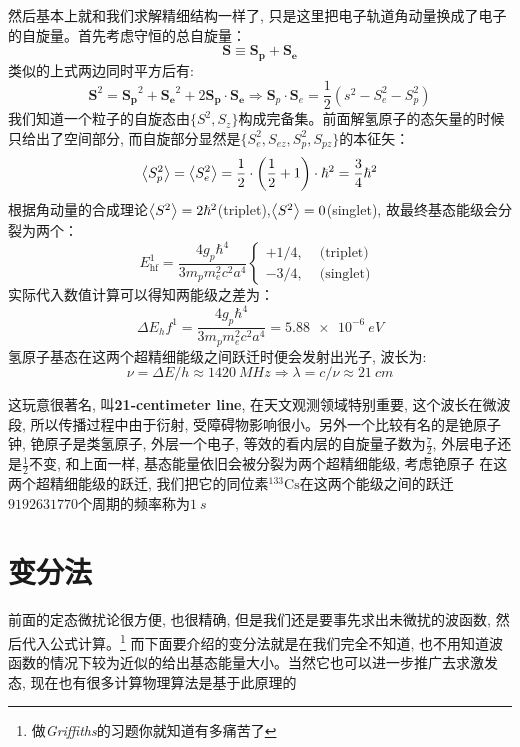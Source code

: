 \documentclass[a4paper,zihao=-4,linespread=1]{ctexrep}
\begin{document}
    然后基本上就和我们求解精细结构一样了, 只是这里把电子轨道角动量换成了电子的自旋量。首先考虑守恒的总自旋量：
    $$\mathbf{S}\equiv\mathbf{S_p}+\mathbf{S_e}$$
    类似的上式两边同时平方后有:
    \begin{equation}
        \mathbf{S}^2=\mathbf{S_p}^2+\mathbf{S_e}^2+2\mathbf{S_p}\cdot\mathbf{S_e}\Rightarrow\mathbf{S}_{p} \cdot \mathbf{S}_{e}=\frac{1}{2}\left(s^{2}-S_{e}^{2}-S_{p}^{2}\right)
    \end{equation}
    我们知道一个粒子的自旋态由$\{S^2,S_z\}$构成完备集。前面解氢原子的态矢量的时候只给出了空间部分, 而自旋部分显然是$\{S_e^2,S_{ez},S_p^2,S_{pz}\}$的本征矢：
    $$\Braket{S_p^2}=\Braket{S_e^2}=\frac{1}{2}\cdot\left(\frac{1}{2}+1\right)\cdot\hbar^2=\frac{3}{4}\hbar^2$$
    根据角动量的合成理论$\Braket{S^2}=2\hbar^2$(triplet),$\Braket{S^2}=0$(singlet), 故最终基态能级会分裂为两个：
    \begin{equation}
        E_{\mathrm{hf}}^{1}=\frac{4 g_{p} \hbar^{4}}{3 m_{p} m_{e}^{2} c^{2} a^{4}}\left\{\begin{array}{ll}
            +1 / 4, & \text { (triplet) } \\
            -3 / 4, & \text { (singlet) }
            \end{array}\right.
    \end{equation}
    实际代入数值计算可以得知两能级之差为：
    $$\Delta E_hf^1=\frac{4 g_{p} \hbar^{4}}{3 m_{p} m_{e}^{2} c^{2} a^{4}}=\SI{5.88e-6}{eV}$$
    氢原子基态在这两个超精细能级之间跃迁时便会发射出光子, 波长为:
    $$\nu=\Delta E/h\approx\SI{1420}{MHz}\Rightarrow \lambda=c/\nu\approx\SI{21}{cm}$$
    
    这玩意很著名, 叫\textbf{21-centimeter line}, 在天文观测领域特别重要, 这个波长在微波段, 所以传播过程中由于衍射, 受障碍物影响很小。另外一个比较有名的是铯原子钟, 
    铯原子是类氢原子, 外层一个电子, 等效的看内层的自旋量子数为$\frac{7}{2}$, 外层电子还是$\frac{1}{2}$不变, 和上面一样, 基态能量依旧会被分裂为两个超精细能级, 考虑铯原子
    在这两个超精细能级的跃迁, 我们把它的同位素$^{133} \mathrm{Cs}$在这两个能级之间的跃迁$9192631770$个周期的频率称为$\SI{1}{s}$

    \chapter{变分法}
    前面的定态微扰论很方便, 也很精确, 但是我们还是要事先求出未微扰的波函数, 然后代入公式计算。\footnote{做{\itshape Griffiths}的习题你就知道有多痛苦了}
    而下面要介绍的变分法就是在我们完全不知道, 也不用知道波函数的情况下较为近似的给出基态能量大小。当然它也可以进一步推广去求激发态, 现在也有很多计算物理算法是基于此原理的
\end{document}
